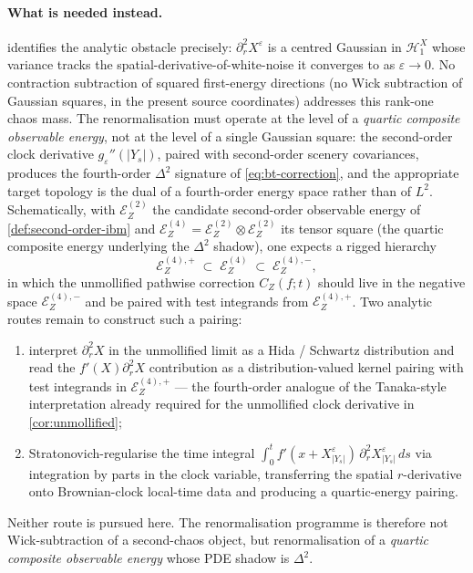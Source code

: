 \documentclass[11pt,reqno]{amsart}
\theoremstyle{plain}
\theoremstyle{definition}
\theoremstyle{remark}
\newcommand{\Hilb}{\mathcal{H}}
\newcommand{\Energy}{\mathcal{E}}
\newcommand{\IBM}{Z}
\begin{document}
\paragraph{What is needed instead.}
 identifies the analytic obstacle
precisely: $\partial_r^{2}X^\varepsilon$ is a centred Gaussian in
$\Hilb_1^{X}$ whose variance tracks the spatial-derivative-of-white-noise
it converges to as $\varepsilon\to 0$. No contraction subtraction of
squared first-energy directions (no Wick subtraction of Gaussian
squares, in the present source coordinates) addresses this rank-one
chaos mass. The renormalisation must operate at the level of a
\emph{quartic composite observable energy}, not at the level of a
single Gaussian square: the second-order clock derivative
$g_\varepsilon''(|Y_s|)$, paired with second-order scenery covariances,
produces the fourth-order $\Delta^{2}$ signature of \eqref{eq:bt-correction},
and the appropriate target topology is the dual of a fourth-order
energy space rather than of $L^{2}$. Schematically, with
$\Energy_\IBM^{(2)}$ the candidate second-order observable energy of
\cref{def:second-order-ibm} and $\Energy_\IBM^{(4)}=\Energy_\IBM^{(2)}\otimes
\Energy_\IBM^{(2)}$ its tensor square (the quartic composite energy
underlying the $\Delta^{2}$ shadow), one expects a rigged hierarchy
\begin{equation}\label{eq:rigged-4}
  \Energy_\IBM^{(4),+}
   \;\subset\;\Energy_\IBM^{(4)}
   \;\subset\;\Energy_\IBM^{(4),-},
\end{equation}
in which the unmollified pathwise correction $C_\IBM(f;t)$ should
live in the negative space $\Energy_\IBM^{(4),-}$ and be paired with
test integrands from $\Energy_\IBM^{(4),+}$. Two analytic routes
remain to construct such a pairing:
\begin{enumerate}
\item[(i)] interpret $\partial_r^{2}X$ in the unmollified limit as a
  Hida / Schwartz distribution and read the
  $f'(X)\partial_r^{2}X$ contribution as a distribution-valued kernel
  pairing with test integrands in $\Energy_\IBM^{(4),+}$ --- the
  fourth-order analogue of the Tanaka-style interpretation already
  required for the unmollified clock derivative in
  \cref{cor:unmollified};
\item[(ii)] Stratonovich-regularise the time integral
  $\int_0^t f'(x+X^\varepsilon_{|Y_s|})\,\partial_r^{2}
   X^\varepsilon_{|Y_s|}\,ds$ via integration by parts in the clock
  variable, transferring the spatial $r$-derivative onto
  Brownian-clock local-time data and producing a quartic-energy
  pairing.
\end{enumerate}
Neither route is pursued here. The renormalisation programme is
therefore not Wick-subtraction of a second-chaos object, but
renormalisation of a \emph{quartic composite observable energy} whose
PDE shadow is $\Delta^{2}$.
\end{document}
